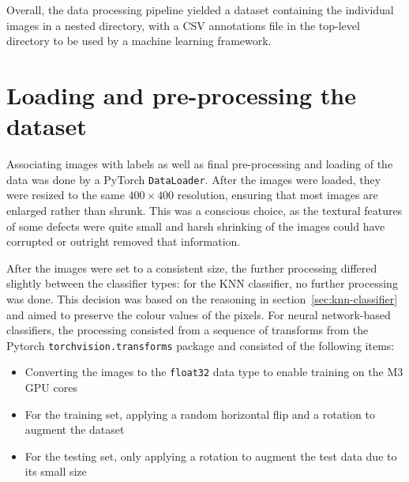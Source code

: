 Overall, the data processing pipeline yielded a dataset containing the individual images in a nested directory, with
a CSV annotations file in the top-level directory to be used by a machine learning framework.


\section{Loading and pre-processing the dataset}
\label{sec:loading-and-pre-processing-the-dataset}
Associating images with labels as well as final pre-processing and loading of the data was done by a PyTorch \verb|DataLoader|.
After the images were loaded, they were resized to the same $400 \times 400$ resolution, ensuring that most images are
enlarged rather than shrunk.
This was a conscious choice, as the textural features of some defects were quite small and harsh shrinking of the images
could have corrupted or outright removed that information.

After the images were set to a consistent size, the further processing differed slightly between the classifier types:
for the KNN classifier, no further processing was done.
This decision was based on the reasoning in section~\ref{sec:knn-classifier} and aimed to preserve the colour values of the pixels.
For neural network-based classifiers, the processing consisted from a sequence of transforms from the Pytorch \verb|torchvision.transforms|
package and consisted of the following items:
\begin{itemize}
    \item Converting the images to the \verb|float32| data type to enable training on the M3 GPU cores
    \item For the training set, applying a random horizontal flip and a rotation to augment the dataset
    \item For the testing set, only applying a rotation to augment the test data due to its small size
\end{itemize}

